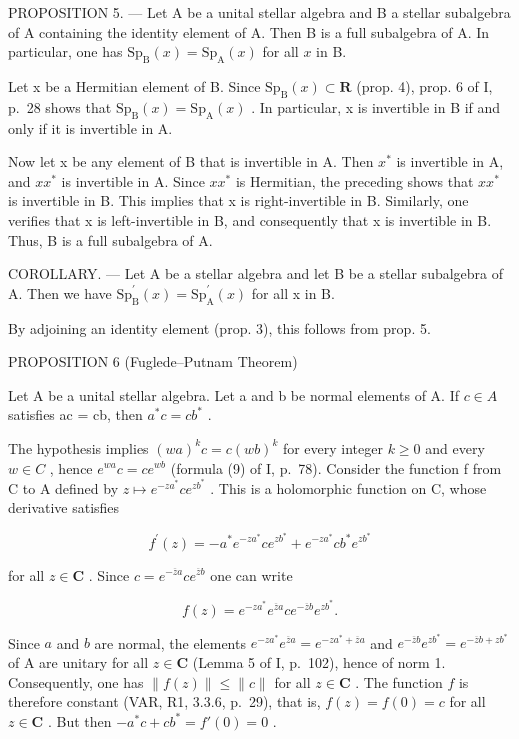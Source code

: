 PROPOSITION 5. — Let A be a unital stellar algebra and B a stellar subalgebra of A containing the identity element of A. Then B is a full subalgebra of A. In particular, one has \(\mathrm{Sp}_{\mathrm{B}}(x) = \mathrm{Sp}_{\mathrm{A}}(x)\) for all \(x\) in B.

Let x be a Hermitian element of B. Since \(\mathrm{Sp}_{\mathrm{B}}(x) \subset \mathbf{R}\) (prop. 4), prop. 6 of I, p.~28 shows that \(\mathrm{Sp}_{\mathrm{B}}(x) = \mathrm{Sp}_{\mathrm{A}}(x)\) . In particular, x is invertible in B if and only if it is invertible in A.

Now let x be any element of B that is invertible in A. Then \(x^{*}\) is invertible in A, and \(xx^{*}\) is invertible in A. Since \(xx^{*}\) is Hermitian, the preceding shows that \(xx^{*}\) is invertible in B. This implies that x is right-invertible in B. Similarly, one verifies that x is left-invertible in B, and consequently that x is invertible in B. Thus, B is a full subalgebra of A.

COROLLARY. --- Let A be a stellar algebra and let B be a stellar subalgebra of A. Then we have \(\mathrm{Sp}_{\mathrm{B}}^{\prime}(x)=\mathrm{Sp}_{\mathrm{A}}^{\prime}(x)\) for all x in B.

By adjoining an identity element (prop. 3), this follows from prop. 5.

PROPOSITION 6 (Fuglede–Putnam Theorem)

Let A be a unital stellar algebra. Let a and b be normal elements of A. If \(c \in A\) satisfies ac = cb, then \(a^{*}c = cb^{*}\) .

The hypothesis implies \((wa)^{k}c = c(wb)^{k}\) for every integer \(k \geqslant 0\) and every \(w \in C\) , hence \(e^{wa}c = ce^{wb}\) (formula (9) of I, p.~78). Consider the function f from C to A defined by \(z \mapsto e^{-za^{*}}ce^{zb^{*}}\) . This is a holomorphic function on C, whose derivative satisfies

\[
f ^ {\prime} (z) = - a ^ {*} e ^ {- z a ^ {*}} c e ^ {z b ^ {*}} + e ^ {- z a ^ {*}} c b ^ {*} e ^ {z b ^ {*}}
\]

for all \(z \in \mathbf{C}\) . Since \(c = e^{-\overline{z}a} ce^{\overline{z}b}\) one can write

\[
f (z) = e ^ {- z a ^ {*}} e ^ {\overline {{z}} a} c e ^ {- \overline {{z}} b} e ^ {z b ^ {*}}.
\]

Since \(a\) and \(b\) are normal, the elements \(e^{-za^*}e^{\overline{z} a} = e^{-za^* + \overline{z} a}\) and \(e^{-\overline{z} b}e^{zb^*} = e^{-\overline{z} b + zb^*}\) of A are unitary for all \(z\in \mathbf{C}\) (Lemma 5 of I, p.~102), hence of norm 1. Consequently, one has \(\| f(z)\| \leqslant \| c\|\) for all \(z\in \mathbf{C}\) . The function \(f\) is therefore constant (VAR, R1, 3.3.6, p.~29), that is, \(f(z) = f(0) = c\) for all \(z\in \mathbf{C}\) . But then \(-a^{*}c + cb^{*} = f'(0) = 0\) .

